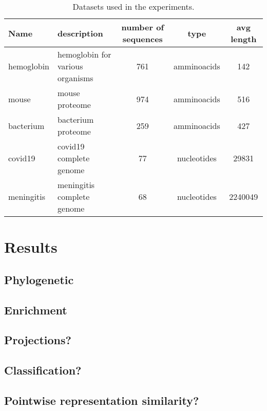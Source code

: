 \documentclass[12pt, letterpaper, twocolumn]{article}
\begin{document}
\onecolumn
\begin{table}[htb]
\centering
\begin{tabular}{|p{3cm} p{3cm} c c c |} 
    \hline
    Name & description & number of sequences & type & avg length   \\ 
    \hline
    hemoglobin &  hemoglobin for various organisms & 761 & amminoacids & 142  \\
    \hline
    mouse & mouse proteome     & 974 & amminoacids & 516 \\
    \hline
    bacterium & bacterium proteome  & 259 &  amminoacids & 427  \\
    \hline
    covid19 & covid19 complete genome & 77 & nucleotides & 29831  \\
    \hline
    meningitis & meningitis complete genome & 68 & nucleotides & 2240049 \\
    \hline
\end{tabular}
\caption{Datasets used in the experiments.}
\label{tab:dataset}
\end{table}
\twocolumn




\section{Results}
\subsection{Phylogenetic}
\subsection{Enrichment}
\subsection{Projections?}
\subsection{Classification?}
\subsection{Pointwise representation similarity?}

\onecolumn
\newpage
\FloatBarrier


\end{document}
